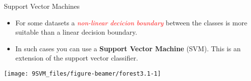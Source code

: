 \documentclass[10pt,ignorenonframetext,]{beamer}
\begin{document}
\begin{frame}{Support Vector Machines}
\protect\hypertarget{support-vector-machines}{}

\begin{itemize}
\item
  For some datasets a
  \emph{\textcolor{red}{non-linear decicion boundary}} between the
  classes is more suitable than a linear decision boundary.
\item
  In such cases you can use a \textbf{Support Vector Machine} (SVM).
  This is an extension of the support vector classifier.
\end{itemize}

\begin{center}\texttt{[image: 9SVM\_files/figure-beamer/forest3.1-1]} \end{center}

\end{frame}
\end{document}
